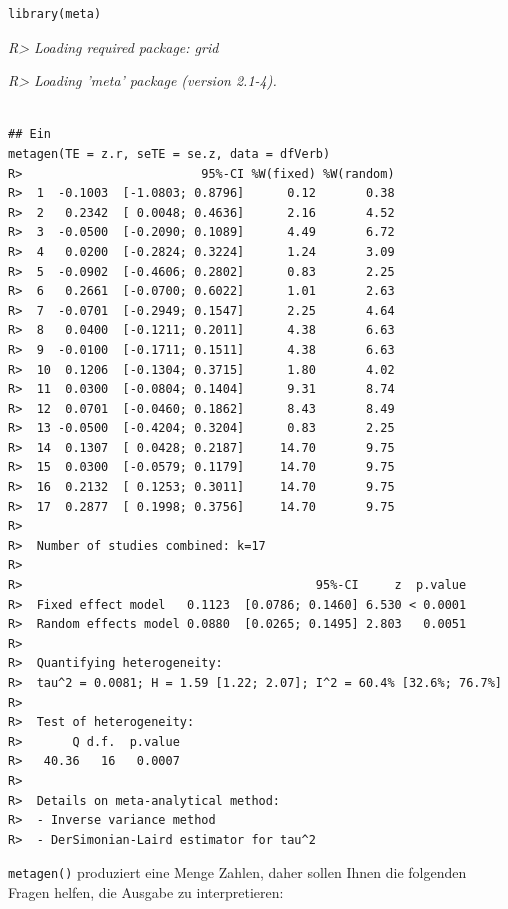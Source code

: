 \documentclass[normalheadings, 10pt]{scrartcl}\usepackage{graphicx, color}
\makeatletter
\newenvironment{kframe}{%
 \def\at@end@of@kframe{}%
 \ifinner\ifhmode%
  \def\at@end@of@kframe{\end{minipage}}%
  \begin{minipage}{\columnwidth}%
 \fi\fi%
 \def\FrameCommand##1{\hskip\@totalleftmargin \hskip-\fboxsep
 \colorbox{shadecolor}{##1}\hskip-\fboxsep
     \hskip-\linewidth \hskip-\@totalleftmargin \hskip\columnwidth}%
 \MakeFramed {\advance\hsize-\width
   \@totalleftmargin\z@ \linewidth\hsize
   \@setminipage}}%
 {\par\unskip\endMakeFramed%
 \at@end@of@kframe}
\newenvironment{knitrout}{}{} %
\newcommand{\code}[1]{\texttt{#1}}
\makeatother
\begin{document}
\begin{rbsp}
\begin{knitrout}
\color{fgcolor}\begin{kframe}
\begin{verbatim}
library(meta)
\end{verbatim}


{\ttfamily\noindent\itshape\textcolor{messagecolor}{R>  Loading required package: grid}}

{\ttfamily\noindent\itshape\textcolor{messagecolor}{R>  Loading 'meta' package (version 2.1-4).}}\begin{verbatim}

## Ein
metagen(TE = z.r, seTE = se.z, data = dfVerb)
R>                         95%-CI %W(fixed) %W(random)
R>  1  -0.1003  [-1.0803; 0.8796]      0.12       0.38
R>  2   0.2342  [ 0.0048; 0.4636]      2.16       4.52
R>  3  -0.0500  [-0.2090; 0.1089]      4.49       6.72
R>  4   0.0200  [-0.2824; 0.3224]      1.24       3.09
R>  5  -0.0902  [-0.4606; 0.2802]      0.83       2.25
R>  6   0.2661  [-0.0700; 0.6022]      1.01       2.63
R>  7  -0.0701  [-0.2949; 0.1547]      2.25       4.64
R>  8   0.0400  [-0.1211; 0.2011]      4.38       6.63
R>  9  -0.0100  [-0.1711; 0.1511]      4.38       6.63
R>  10  0.1206  [-0.1304; 0.3715]      1.80       4.02
R>  11  0.0300  [-0.0804; 0.1404]      9.31       8.74
R>  12  0.0701  [-0.0460; 0.1862]      8.43       8.49
R>  13 -0.0500  [-0.4204; 0.3204]      0.83       2.25
R>  14  0.1307  [ 0.0428; 0.2187]     14.70       9.75
R>  15  0.0300  [-0.0579; 0.1179]     14.70       9.75
R>  16  0.2132  [ 0.1253; 0.3011]     14.70       9.75
R>  17  0.2877  [ 0.1998; 0.3756]     14.70       9.75
R>  
R>  Number of studies combined: k=17
R>  
R>                                         95%-CI     z  p.value
R>  Fixed effect model   0.1123  [0.0786; 0.1460] 6.530 < 0.0001
R>  Random effects model 0.0880  [0.0265; 0.1495] 2.803   0.0051
R>  
R>  Quantifying heterogeneity:
R>  tau^2 = 0.0081; H = 1.59 [1.22; 2.07]; I^2 = 60.4% [32.6%; 76.7%]
R>  
R>  Test of heterogeneity:
R>       Q d.f.  p.value
R>   40.36   16   0.0007
R>  
R>  Details on meta-analytical method:
R>  - Inverse variance method
R>  - DerSimonian-Laird estimator for tau^2
\end{verbatim}
\end{kframe}
\end{knitrout}

\end{rbsp}

\code{metagen()} produziert eine Menge Zahlen, daher sollen Ihnen die
folgenden Fragen helfen, die Ausgabe zu interpretieren:
\end{document}
